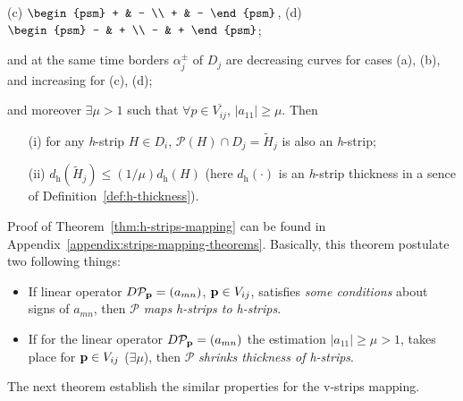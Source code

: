 \begin{theorem}
\begin{enumerate}
\begin{center}
				(c) $\begin{psm} + & - \\ + & - \end{psm}$, \quad
				(d) $\begin{psm} - & + \\ - & + \end{psm}$;		
			\end{center}
			and at the same time borders $\alpha_j^{\pm}$ of $D_j$ are decreasing curves for cases (a), (b), and increasing for (c), (d);
	\end{enumerate}
	and moreover $\exists \mu > 1$ such that $\forall p \in \overline{V_{ij}}$, $|a_{11}| \ge \mu$.
	Then
	\begin{itemize}
		\item[(i)] for any \emph{h}-strip $H \in D_i$, $\mathcal{P} (H) \cap D_j = \widetilde{H}_j$ is also an \emph{h}-strip;
		\item[(ii)] $d_{\mathrm{h}}(\widetilde{H}_j) \le (1 / \mu) d_{\mathrm{h}}(H)$ (here $d_{\mathrm{h}}(\cdot)$ is an \emph{h}-strip thickness in a sence of Definition~\ref{def:h-thickness}).
	\end{itemize}
\end{theorem}
Proof of Theorem~\ref{thm:h-strips-mapping} can be found in Appendix~\ref{appendix:strips-mapping-theorems}.
Basically, this theorem postulate two following things:
\begin{itemize}
	\item If linear operator $D \mathcal{P}_{\vb{p}} = (a_{mn})$, $\vb{p} \in V_{ij}$, satisfies {\it some conditions} about signs of $a_{mn}$, then $\mathcal{P}$ {\it maps h-strips to h-strips}.
	\item If for the linear operator $D \mathcal{P}_{\vb{p}} = (a_{mn})$ the estimation $|a_{11}| \ge \mu > 1$, takes place for $\vb{p} \in V_{ij}$ ($\exists \mu$), then $\mathcal{P}$ {\it shrinks thickness of h-strips}.
\end{itemize}
The next theorem establish the similar properties for the v-strips mapping.

